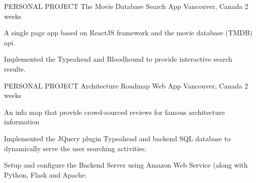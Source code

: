 

\begin{cventries}


  \cventry
    {PERSONAL PROJECT} %
    {The Movie Database Search App} %
    {Vancouver, Canada} %
    {2 weeks} %
    {
      \begin{cvitems} %
        \item {A single page app based on ReactJS framework and the movie database (TMDB) api.}
        \item {Implemented the Typeahead and Bloodhound to provide interactive search results.}
      \end{cvitems}
    }

  \cventry
    {PERSONAL PROJECT} %
    {Architecture Roadmap Web App} %
    {Vancouver, Canada} %
    {2 weeks} %
    {
      \begin{cvitems} %
        \item {An info map that provide crowd-sourced reviews for famous architecture information}
        \item {Implemented the JQuery plugin Typeahead and backend SQL database to dynamically serve the user searching activities.}
        \item {Setup and configure the Backend Server using Amazon Web Service (along with Python, Flask and Apache.}
      \end{cvitems}
    }



\end{cventries}
